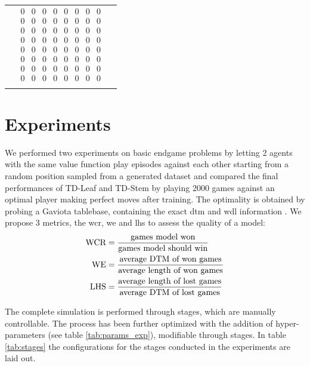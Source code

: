 \documentclass[twocolumn]{phdsymp} %
\begin{document}
\begin{table}[]
\begin{tabular}{c c c}
&
$\begin{smallmatrix}0&0&0&0&0&0&0&0\\0&0&0&0&0&0&0&0\\0&0&0&0&0&0&0&0\\0&0&0&0&0&0&0&0\\0&0&0&0&0&0&0&0\\0&0&0&0&0&0&0&0\\0&0&0&0&0&0&0&0\\0&0&0&0&0&0&0&0\end{smallmatrix}$
\\&&\\
\hline
\end{tabular}
\end{table}


\section{Experiments}
\label{sec:res}
We performed two experiments on basic endgame problems by letting 2 agents with the same value function play episodes against each other starting from a random position sampled from a generated dataset and compared the final performances of TD-Leaf and TD-Stem by playing 2000 games against an optimal player making perfect moves after training. The optimality is obtained by probing a Gaviota tablebase, containing the exact \gls{dtm} and \gls{wdl} information \cite{tb}. We propose 3 metrics, the \gls{wcr}, \gls{we} and \gls{lhs} to assess the quality of a model: \textcolor{white}{Fabian}
\begin{align*}
\textnormal{WCR}&=\frac{\text{games model won}}{\text{games model should win}} \\
\textnormal{WE}&=\frac{\text{average DTM of won games}}{\text{average length of won games}}\\
\textnormal{LHS}&=\frac{\text{average length of lost games}}{\text{average DTM of lost games}}\\
\end{align*}

The complete simulation is performed through stages, which are manually controllable.
The process has been further optimized with the addition of hyper-parameters (see table \ref{tab:params_exp}), modifiable through stages. In table \ref{tab:stages} the configurations for the stages conducted in the experiments are laid out.
\end{document}
